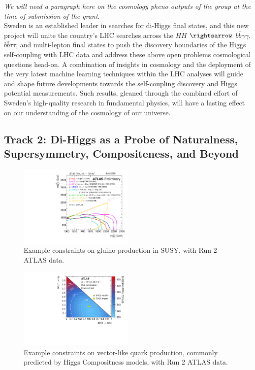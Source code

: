 \documentclass[10pt,oneside,notitlepage,abstracton,a4paper]{scrartcl}
\begin{document}
\textit{We will need a paragraph here on the cosmology pheno outputs of the group at the time of submission of the grant}. \\

Sweden is an established leader in searches for di-Higgs final states, and this new project will unite the country's LHC searches across the $HH$ $\rightsarrow$ $b\bar{b}\gamma\gamma$, $b\bar{b}\tau\tau$, and multi-lepton final states to push the discovery boundaries of the Higgs self-coupling with LHC data and address these above open problems cosmological questions head-on. A combination of insights in cosmology and the deployment of the very latest machine learning techniques within the LHC analyses will guide and shape future developments towards the self-coupling discovery and Higgs potential measurements. Such results, gleaned through the combined effort of Sweden’s high-quality research in fundamental physics, will have a lasting effect on our understanding of the cosmology of our universe. \\

\subsection{Track 2: Di-Higgs as a Probe of Naturalness, Supersymmetry, Compositeness, and Beyond}

\begin{figure}[!ht]
\centering
\includegraphics[width=0.5\textwidth]{Figures/summarySUSY}
\caption{Example constraints on gluino production in SUSY, with Run 2 ATLAS data.}
\label{fig:summarySUSY}
\end{figure}

\begin{figure}[!ht]
\centering
\includegraphics[width=0.5\textwidth]{Figures/summaryVLQs}
\caption{Example constraints on vector-like quark production, commonly predicted by Higgs Compositness models, with Run 2 ATLAS data.}
\label{fig:summaryVLQs}
\end{figure}
\end{document}
